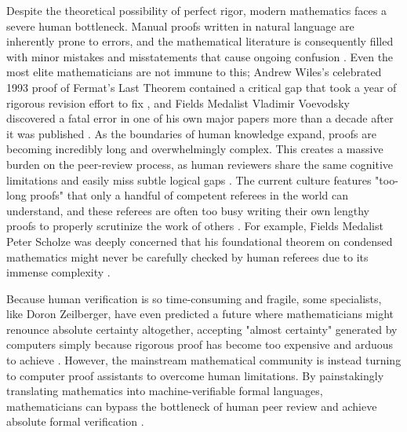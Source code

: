 Despite the theoretical possibility of perfect rigor, modern mathematics faces a severe human bottleneck. Manual proofs written in natural language are inherently prone to errors, and the mathematical literature is consequently filled with minor mistakes and misstatements that cause ongoing confusion \cite{avigad_mathematics_2024}. Even the most elite mathematicians are not immune to this; Andrew Wiles's celebrated 1993 proof of Fermat’s Last Theorem contained a critical gap that took a year of rigorous revision effort to fix \cite{de_toffoli_proofs_2024, hanna_proof_2012}, and Fields Medalist Vladimir Voevodsky discovered a fatal error in one of his own major papers more than a decade after it was published \cite{de_toffoli_proofs_2024}. As the boundaries of human knowledge expand, proofs are becoming incredibly long and overwhelmingly complex. This creates a massive burden on the peer-review process, as human reviewers share the same cognitive limitations and easily miss subtle logical gaps \cite{de_toffoli_proofs_2024}. The current culture features "too-long proofs" that only a handful of competent referees in the world can understand, and these referees are often too busy writing their own lengthy proofs to properly scrutinize the work of others \cite{de_toffoli_proofs_2024}. For example, Fields Medalist Peter Scholze was deeply concerned that his foundational theorem on condensed mathematics might never be carefully checked by human referees due to its immense complexity \cite{de_toffoli_proofs_2024}.

Because human verification is so time-consuming and fragile, some specialists, like Doron Zeilberger, have even predicted a future where mathematicians might renounce absolute certainty altogether, accepting "almost certainty" generated by computers simply because rigorous proof has become too expensive and arduous to achieve \cite{de_toffoli_proofs_2024}. However, the mainstream mathematical community is instead turning to computer proof assistants to overcome human limitations. By painstakingly translating mathematics into machine-verifiable formal languages, mathematicians can bypass the bottleneck of human peer review and achieve absolute formal verification \cite{de_toffoli_proofs_2024}.


